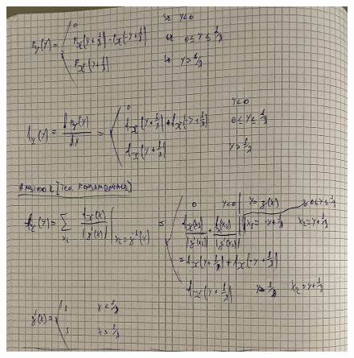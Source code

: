 \documentclass{article}
\begin{document}
\begin{figure}[ht]
\centering
\includegraphics[scale=0.10]{ese/29a.jpeg}
\end{figure}
\end{document}
